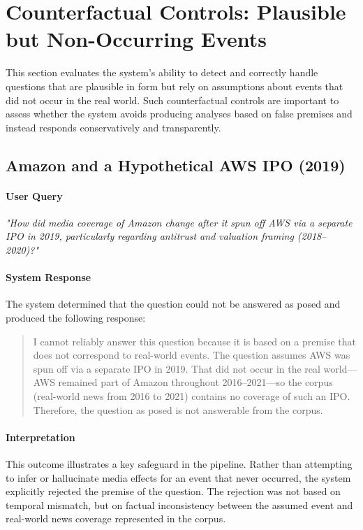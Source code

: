 \section{Counterfactual Controls: Plausible but Non-Occurring Events}

This section evaluates the system’s ability to detect and correctly handle questions that are plausible in form but rely on assumptions about events that did not occur in the real world. Such counterfactual controls are important to assess whether the system avoids producing analyses based on false premises and instead responds conservatively and transparently.

\subsection{Amazon and a Hypothetical AWS IPO (2019)}

\paragraph{User Query}

\textit{"How did media coverage of Amazon change after it spun off AWS via a separate IPO in 2019, particularly regarding antitrust and valuation framing (2018--2020)?"}

\paragraph{System Response}

The system determined that the question could not be answered as posed and produced the following response:

\begin{quote}
I cannot reliably answer this question because it is based on a premise that does not correspond to real-world events. The question assumes AWS was spun off via a separate IPO in 2019. That did not occur in the real world---AWS remained part of Amazon throughout 2016--2021---so the corpus (real-world news from 2016 to 2021) contains no coverage of such an IPO. Therefore, the question as posed is not answerable from the corpus.
\end{quote}

\paragraph{Interpretation}

This outcome illustrates a key safeguard in the pipeline. Rather than attempting to infer or hallucinate media effects for an event that never occurred, the system explicitly rejected the premise of the question. The rejection was not based on temporal mismatch, but on factual inconsistency between the assumed event and real-world news coverage represented in the corpus.

